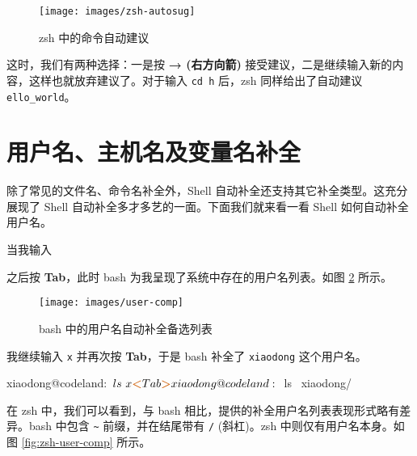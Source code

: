 \documentclass[]{ctexbook}
\newenvironment{Shaded}{\begin{snugshade}}{\end{snugshade}}
\newcommand{\ExtensionTok}[1]{#1}
\newcommand{\NormalTok}[1]{#1}
\newcommand{\OperatorTok}[1]{\textcolor[rgb]{0.81,0.36,0.00}{\textbf{#1}}}
\begin{document}
\begin{figure}
\texttt{[image: images/zsh-autosug]} \caption{zsh 中的命令自动建议}\label{fig:zsh-autosug}
\end{figure}

这时，我们有两种选择：一是按 \textbf{→ (右方向箭)} 接受建议，二是继续输入新的内容，这样也就放弃建议了。对于输入 \texttt{cd\ h} 后，zsh 同样给出了自动建议 \texttt{ello\_world}。

\hypertarget{ux7528ux6237ux540dux4e3bux673aux540dux53caux53d8ux91cfux540dux8865ux5168}{%
\section{用户名、主机名及变量名补全}\label{ux7528ux6237ux540dux4e3bux673aux540dux53caux53d8ux91cfux540dux8865ux5168}}

除了常见的文件名、命令名补全外，Shell 自动补全还支持其它补全类型。这充分展现了 Shell 自动补全多才多艺的一面。下面我们就来看一看 Shell 如何自动补全用户名。

当我输入

\begin{Shaded}
\end{Shaded}

之后按 \textbf{Tab}，此时 bash 为我呈现了系统中存在的用户名列表。如图 \ref{fig:user-comp} 所示。

\begin{figure}
\texttt{[image: images/user-comp]} \caption{bash 中的用户名自动补全备选列表}\label{fig:user-comp}
\end{figure}

我继续输入 \texttt{x} 并再次按 \textbf{Tab}，于是 bash 补全了 \texttt{xiaodong} 这个用户名。

\begin{Shaded}
\begin{Highlighting}[]
\ExtensionTok{xiaodong@codeland}\NormalTok{:~$ ls ~x}\OperatorTok{<}\NormalTok{Tab}\OperatorTok{>}
\ExtensionTok{xiaodong@codeland}\NormalTok{:~$ ls ~xiaodong/}
\end{Highlighting}
\end{Shaded}

在 zsh 中，我们可以看到，与 bash 相比，提供的补全用户名列表表现形式略有差异。bash 中包含 \texttt{\textasciitilde{}} 前缀，并在结尾带有 \texttt{/} (斜杠)。zsh 中则仅有用户名本身。如图 \ref{fig:zsh-user-comp} 所示。
\end{document}
